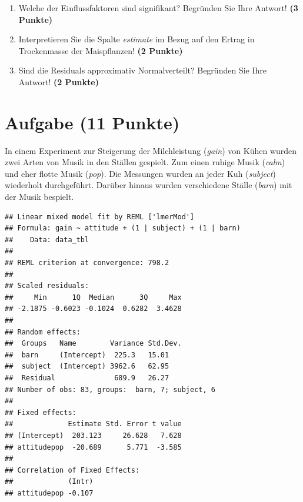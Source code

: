 \documentclass[a4paper, 10pt]{scrartcl}\usepackage[]{graphicx}\usepackage[]{xcolor}
\makeatletter
\newenvironment{kframe}{%
 \def\at@end@of@kframe{}%
 \ifinner\ifhmode%
  \def\at@end@of@kframe{\end{minipage}}%
  \begin{minipage}{\columnwidth}%
 \fi\fi%
 \def\FrameCommand##1{\hskip\@totalleftmargin \hskip-\fboxsep
 \colorbox{shadecolor}{##1}\hskip-\fboxsep
     \hskip-\linewidth \hskip-\@totalleftmargin \hskip\columnwidth}%
 \MakeFramed {\advance\hsize-\width
   \@totalleftmargin\z@ \linewidth\hsize
   \@setminipage}}%
 {\par\unskip\endMakeFramed%
 \at@end@of@kframe}
\newenvironment{knitrout}{}{} %
\makeatother
\begin{document}
\begin{enumerate}
\item Welche der Einflussfaktoren sind signifikant? Begr{\"u}nden Sie Ihre
  Antwort! \textbf{(3 Punkte)}
\item Interpretieren Sie die Spalte \textit{estimate} im Bezug auf den
  Ertrag in Trockenmasse der Maispflanzen! \textbf{(2 Punkte)}
\item Sind die Residuals approximativ Normalverteilt? Begr{\"u}nden Sie Ihre Antwort! \textbf{(2 Punkte)}
\end{enumerate}
 
\clearpage

\section{Aufgabe \hfill (11 Punkte)}

In einem Experiment zur Steigerung der Milchleistung (\textit{gain}) von
K{\"u}hen wurden zwei Arten von Musik in den St{\"a}llen gespielt. Zum einen ruhige
Musik (\textit{calm}) und eher flotte Musik (\textit{pop}). Die Messungen
wurden an jeder Kuh (\textit{subject}) wiederholt durchgef{\"u}hrt. Dar{\"u}ber
hinaus wurden verschiedene St{\"a}lle (\textit{barn}) mit der Musik bespielt.

\begin{knitrout}
\color{fgcolor}\begin{kframe}
\begin{verbatim}
## Linear mixed model fit by REML ['lmerMod']
## Formula: gain ~ attitude + (1 | subject) + (1 | barn)
##    Data: data_tbl
## 
## REML criterion at convergence: 798.2
## 
## Scaled residuals: 
##     Min      1Q  Median      3Q     Max 
## -2.1875 -0.6023 -0.1024  0.6282  3.4628 
## 
## Random effects:
##  Groups   Name        Variance Std.Dev.
##  barn     (Intercept)  225.3   15.01   
##  subject  (Intercept) 3962.6   62.95   
##  Residual              689.9   26.27   
## Number of obs: 83, groups:  barn, 7; subject, 6
## 
## Fixed effects:
##             Estimate Std. Error t value
## (Intercept)  203.123     26.628   7.628
## attitudepop  -20.689      5.771  -3.585
## 
## Correlation of Fixed Effects:
##             (Intr)
## attitudepop -0.107
\end{verbatim}
\end{kframe}
\end{knitrout}
\end{document}
